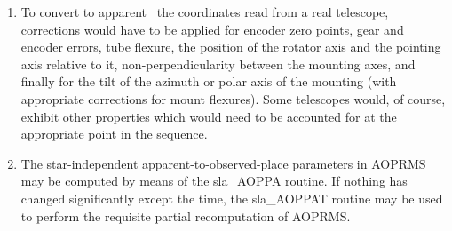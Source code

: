 {\begin{enumerate}
        \radec\ will be required,
        in which case further transformations will be necessary.  The
        sla\_AMP {\it etc.}\ routines will convert
        the apparent \radec\ produced
        by the present routine into an FK5 J2000 mean place, by
        allowing for the Sun's gravitational lens effect, annual
        aberration, nutation and precession.  Should FK4 B1950
        coordinates be needed, the routines sla\_FK524 {\it etc.}\ will also
        need to be applied.
  \item To convert to apparent \radec\ the coordinates read from a
        real telescope, corrections would have to be applied for
        encoder zero points, gear and encoder errors, tube flexure,
        the position of the rotator axis and the pointing axis
        relative to it, non-perpendicularity between the mounting
        axes, and finally for the tilt of the azimuth or polar axis
        of the mounting (with appropriate corrections for mount
        flexures).  Some telescopes would, of course, exhibit other
        properties which would need to be accounted for at the
        appropriate point in the sequence.
  \item The star-independent apparent-to-observed-place parameters
        in AOPRMS may be computed by means of the sla\_AOPPA routine.
        If nothing has changed significantly except the time, the
        sla\_AOPPAT routine may be used to perform the requisite
        partial recomputation of AOPRMS.
 \end{enumerate}
}
{
}
{
}
{
}
{
  \\
  \\
  \\
}
\notes
